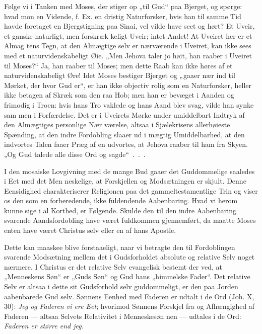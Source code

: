 \documentclass[12pt]{book}
\newcommand{\opage}[1]{\marginnote{\footnotesize\textit{[#1]}}}
\begin{document}
Følge vi i Tanken med Moses, der stiger op „til
Gud“ paa Bjerget, og spørge: hvad mon en Vidende,
f. Ex. en dristig Naturforsker, hvis han til samme Tid
havde foretaget en Bjergstigning paa Sinai, vel vilde have
seet og hørt? Et Uveir, et ganske naturligt, men forskræk\-%
keligt Uveir; intet Andet! At Uveiret her er et Almag\-%
tens Tegn, at den Almægtige selv er nærværende i
Uveiret, kan ikke sees med et naturvidenskabeligt Øie.
„Men Jehova taler jo høit, han raaber i Uveiret til
Moses?“ Ja, han raaber til Moses; men dette Raab kan
ikke høres af et naturvidenskabeligt Øre! Idet Moses
bestiger Bjerget og „gaaer nær ind til Mørket, der hvor
Gud er“, er han ikke objectiv rolig som en Naturforsker,
heller ikke betagen af Skræk som den raa Hob; men han
er bevæget i Aanden og frimodig i Troen: hvis hans Tro
vaklede og hans Aand blev svag, vilde han synke sam\-%
men i Forfærdelse. Det er i Uveirets Mørke under
umiddelbart Indtryk af den Almægtiges personlige Nær\-%
værelse, altsaa i Sjælekrisens allerhøieste Spænding, at
den indre Fordobling slaaer ud i mægtig Umiddelbarhed,
at den indvortes Talen faaer Præg af en udvortes, at Jehova
\opage{190}\setcounter{footnote}{0}%
raaber til ham fra Skyen. „Og Gud talede alle disse
Ord og sagde“~.~.~.

I den mosaiske Lovgivning med de mange Bud
gaaer det Guddommelige saaledes i Eet med det Men\-%
neskelige, at Forskjellen og Modsætningen er skjult.
Denne Eensidighed charakteriserer Religionen paa det
gammeltestamentlige Trin og viser os den som en
forberedende, ikke fuldendende Aabenbaring. Hvad vi
herom kunne sige i al Korthed, er Følgende. Skulde
den til den indre Aabenbaring svarende Aandsfordobling
have været fuldkommen gjennemført, da maatte Moses
enten have været Christus selv eller en af hans Apostle.

Dette kan maaskee blive forstaaeligt, naar vi betragte
den til Fordoblingen svarende Modsætning mellem det i
Gudsforholdet absolute og relative Selv noget nærmere.
I Christus er det relative Selv evangelisk bestemt der\-%
ved, at „Menneskens Søn“ er „Guds Søn“ og Gud hans
„himmelske Fader“. Det relative Selv er altsaa i dette
sit Gudsforhold selv guddommeligt, er den paa Jorden
aabenbarede Gud selv. Sønnens Eenhed med Faderen
er udtalt i de Ord (Joh. X, 30): \textit{Jeg og Faderen vi
ere Eet}; hvorimod Sønnens Forskjel fra og Afhængighed
af Faderen --- altsaa Selvets Relativitet i Menneskesøn\-%
nen --- udtales i de Ord: \textit{Faderen er større end jeg.}
\end{document}
